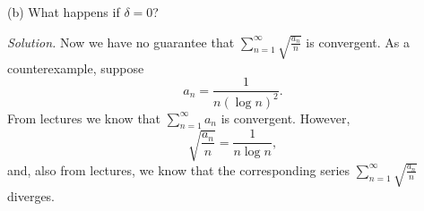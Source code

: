 \documentclass{article}
\begin{document}
(b) What happens if $\delta = 0$?

\textit{Solution.}
Now we have no guarantee that $\sum_{n = 1}^\infty \sqrt{\frac{a_n}{n
}}$ is convergent. As a counterexample, suppose
%
\begin{equation*}
    a_n = \frac{1}{n (\log n)^2}
    .
\end{equation*}
%
From lectures we know that $\sum_{n = 1}^\infty a_n$ is convergent. However,
%
\begin{equation*}
    \sqrt{\frac{a_n}{n}} = \frac{1}{n \log n}
    ,
\end{equation*}
%
and, also from lectures, we know that the corresponding series $\sum_{n
= 1}^\infty \sqrt{\frac{a_n}{n }}$ diverges.
\end{document}
